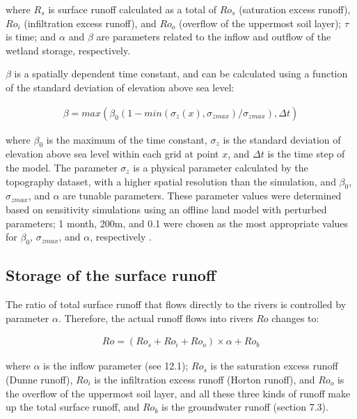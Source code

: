 where \(R_{s}\) is surface runoff calculated as a total of \(Ro_{s}\) (saturation excess runoff), \(Ro_{i}\) (infiltration excess runoff), and \(Ro_{o}\) (overflow of the uppermost soil layer);
\(\tau\) is time; and \(\alpha\) and \(\beta\) are parameters related to the inflow and outflow of the wetland storage, respectively.

\(\beta\) is a spatially dependent time constant, and can be calculated using a function of the standard deviation of elevation above sea level:

\begin{eqnarray}
\beta =max(\beta_{0}(1-min(\sigma_{z}(x),\sigma_{z max})/\sigma_{z max}), \Delta t)
\end{eqnarray}

where \(\beta_{0}\) is the maximum of the time constant, \(\sigma_{z}\) is the standard deviation of elevation above sea level within each grid at point \(x\), and \(\Delta t\) is the time step of the
model. The parameter \(\sigma_{z}\) is a physical parameter calculated by the topography dataset, with a higher spatial resolution than the simulation, and \(\beta_{0}\), \(\sigma_{zmax}\), and
\(\alpha\) are tunable parameters. These parameter values were determined based on sensitivity simulations using an offline land model with perturbed parameters; 1 month, 200m, and 0.1 were chosen as
the most appropriate values for \(\beta_{0}\), \(\sigma _{zmax}\), and \(\alpha\), respectively \citep{Nitta2015-ob}.

\subsection{Storage of the surface runoff}\label{storage-of-the-surface-runoff}

The ratio of total surface runoff that flows directly to the rivers is controlled by parameter \(\alpha\). Therefore, the actual runoff flows into rivers \(Ro\) changes to:

\begin{eqnarray}
Ro=(Ro_{s}+Ro_{i}+Ro_{o})\times \alpha + Ro_{b}
\end{eqnarray}

where \(\alpha\) is the inflow parameter (see 12.1); \(Ro_{s}\) is the saturation excess runoff (Dunne runoff), \(Ro_{i}\) is the infiltration excess runoff (Horton runoff), and \(Ro_{o}\) is the
overflow of the uppermost soil layer, and all these three kinds of runoff make up the total surface runoff, and \(Ro_{b}\) is the groundwater runoff (section 7.3).

